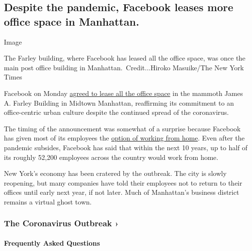 \hypertarget{despite-the-pandemic-facebook-leases-more-office-space-in-manhattan}{%
\subsection{Despite the pandemic, Facebook leases more office space in
Manhattan.}\label{despite-the-pandemic-facebook-leases-more-office-space-in-manhattan}}

Image

The Farley building, where Facebook has leased all the office space, was
once the main post office building in Manhattan.~Credit...Hiroko
Masuike/The New York Times

Facebook on Monday
\href{https://www.nytimes.com/2020/08/03/nyregion/facebook-nyc-office-farley-building.html}{agreed
to lease all the office space} in the mammoth James A. Farley Building
in Midtown Manhattan, reaffirming its commitment to an office-centric
urban culture despite the continued spread of the coronavirus.

The timing of the announcement was somewhat of a surprise because
Facebook has given most of its employees the
\href{https://www.nytimes.com/2020/05/21/technology/facebook-remote-work-coronavirus.html}{option
of working from home}. Even after the pandemic subsides, Facebook has
said that within the next 10 years, up to half of its roughly 52,200
employees across the country would work from home.

New York's economy has been cratered by the outbreak. The city is slowly
reopening, but many companies have told their employees not to return to
their offices until early next year, if not later. Much of Manhattan's
business district remains a virtual ghost town.

\href{https://www.nytimes.com/news-event/coronavirus?action=click\&pgtype=Article\&state=default\&region=MAIN_CONTENT_3\&context=storylines_faq}{}

\hypertarget{the-coronavirus-outbreak-}{%
\subsubsection{The Coronavirus Outbreak
›}\label{the-coronavirus-outbreak-}}

\hypertarget{frequently-asked-questions}{%
\paragraph{Frequently Asked
Questions}\label{frequently-asked-questions}}

